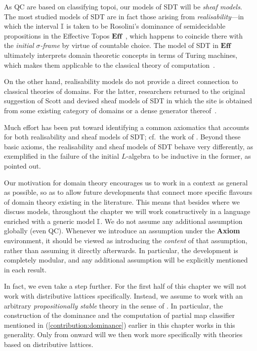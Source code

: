 \begin{remark}
  As \gls{QC} are based on classifying topoi, our models of \gls{SDT} will be \emph{sheaf models}. The most studied models of \gls{SDT} are in fact those arising from \emph{realisability}---in which the interval $\mathbb{I}$ is taken to be Rosolini's dominance of semidecidable propositions in the Effective Topos $\mathbf{Eff}$~\citep{hyland_first_2006,PhoaWesleyKym-Son1991DtiR}, which happens to coincide there with the \emph{initial $\sigma$-frame} by virtue of countable choice. The model of \gls{SDT} in $\mathbf{Eff}$ ultimately interprets domain theoretic concepts in terms of Turing machines, which makes them applicable to the classical theory of computation~\citep{bauer_first_2006}. 

  On the other hand, realisability models do not provide a direct connection to classical theories of domains. For the latter, researchers returned to the original suggestion of Scott and devised sheaf models of \gls{SDT} in which the site is obtained from some existing category of domains or a dense generator thereof~\citep{fiore-plotkin:1996,FIORE1997151,fiore2001domains}.

  Much effort has been put toward identifying a common axiomatics that accounts for both realisability and sheaf models of \gls{SDT}; cf.\ the work of \citet{reus-streicher:1999,simpson:2004}. Beyond these basic axioms, the realisability and sheaf models of \gls{SDT} behave very differently, as exemplified in the failure of the initial $L$-algebra to be inductive in the former, as \citet{VANOOSTEN2000233} pointed out.
\end{remark}

Our motivation for domain theory encourages us to work in a context as general as possible, so as to allow future developments that connect more specific flavours of domain theory existing in the literature. This means that besides  where we discuss models, throughout the chapter we will work constructively in a language enriched with a generic model $\mathbb{I}$. We do not assume any additional assumption globally (even \gls{QC}). Whenever we introduce an assumption under the \textbf{Axiom} environment, it should be viewed as introducing the \emph{content} of that assumption, rather than assuming it directly afterwards. In particular, the development is completely modular, and any additional assumption will be explicitly mentioned in each result.

In fact, we even take a step further. For the first half of this chapter we will not work with distributive lattices specifically. Instead, we assume to work with an arbitrary \emph{propositionally stable} theory in the sense of . In particular, the construction of the dominance and the computation of partial map classifier mentioned in (\ref{contribution:dominance}) earlier in this chapter works in this generality. Only from  onward will we then work more specifically with theories based on distributive lattices.

